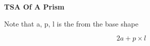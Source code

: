 \item{\textbf{TSA Of A Prism}}

Note that a, p, l is the from the base shape

$$ 2{a} + {p} \times {l} $$
